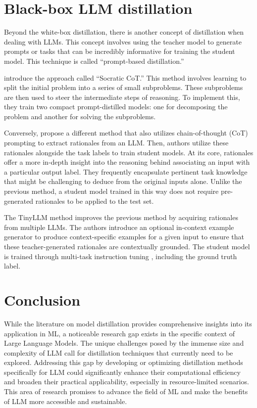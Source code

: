 \section{Black-box LLM distillation}

Beyond the white-box distillation, there is another concept of distillation when dealing with LLMs. This concept involves using the teacher model to generate prompts or tasks that can be incredibly informative for training the student model. This technique is called “prompt-based distillation.”

\citeauthor{socraticcot} \cite{socraticcot} introduce the approach called ``Socratic CoT\@.'' This method involves learning to split the initial problem into a series of small subproblems. These subproblems are then used to steer the intermediate steps of reasoning. To implement this, they train two compact prompt-distilled models: one for decomposing the problem and another for solving the subproblems.

Conversely, \citeauthor{stepbystep} \cite{stepbystep} propose a different method that also utilizes chain-of-thought (CoT) \cite{cot} prompting to extract rationales from an LLM\@. Then, authors utilize these rationales alongside the task labels to train student models. At its core, rationales offer a more in-depth insight into the reasoning behind associating an input with a particular output label. They frequently encapsulate pertinent task knowledge that might be challenging to deduce from the original inputs alone. Unlike the previous method, a student model trained in this way does not require pre-generated rationales to be applied to the test set.

The TinyLLM method \cite{tinyllm} improves the previous method by acquiring rationales from multiple LLMs. The authors introduce an optional in-context example generator to produce context-specific examples for a given input to ensure that these teacher-generated rationales are contextually grounded. The student model is trained through multi-task instruction tuning \cite{t5,t0}, including the ground truth label.

\section*{Conclusion}

While the literature on model distillation provides comprehensive insights into its application in ML, a noticeable research gap exists in the specific context of Large Language Models. The unique challenges posed by the immense size and complexity of LLM call for distillation techniques that currently need to be explored. Addressing this gap by developing or optimizing distillation methods specifically for LLM could significantly enhance their computational efficiency and broaden their practical applicability, especially in resource-limited scenarios. This area of research promises to advance the field of ML and make the benefits of LLM more accessible and sustainable.
